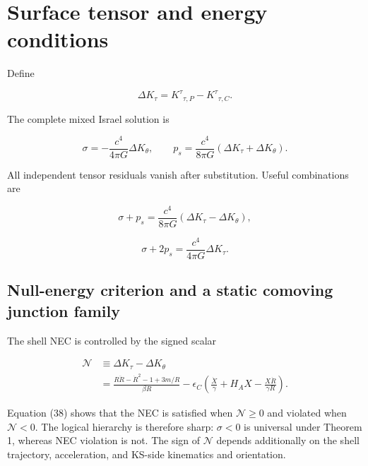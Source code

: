 \documentclass[pdflatex,sn-mathphys-num]{sn-jnl}
\begin{document}
\section{Surface tensor and energy conditions}

Define


\begin{equation}
\Delta K_\tau
=K^\tau{}_{\tau,P}-K^\tau{}_{\tau,C}.
\tag{36}
\end{equation}

The complete mixed Israel solution is


\begin{equation}
\boxed{
\sigma=-\frac{c^4}{4\pi G}\Delta K_\theta,
\qquad
p_s=\frac{c^4}{8\pi G}
\left(\Delta K_\tau+\Delta K_\theta\right).
}
\tag{37}
\end{equation}

All independent tensor residuals vanish after substitution. Useful combinations are


\begin{equation}
\sigma+p_s
=\frac{c^4}{8\pi G}
\left(\Delta K_\tau-\Delta K_\theta\right),
\tag{38}
\end{equation}

\begin{equation}
\sigma+2p_s
=\frac{c^4}{4\pi G}\Delta K_\tau.
\tag{39}
\end{equation}

\subsection{Null-energy criterion and a static comoving junction family}

The shell NEC is controlled by the signed scalar


\begin{equation}
\begin{aligned}
\mathcal N
&\equiv \Delta K_\tau-\Delta K_\theta \\
&=\frac{R\ddot R-\dot R^2-1+3m/R}{\beta R}
-\epsilon_C\left(
\frac{\dot X}{\gamma}+H_AX
-\frac{X\dot R}{\gamma R}
\right).
\end{aligned}
\tag{40}
\end{equation}

Equation (38) shows that the NEC is satisfied when \(\mathcal N\ge0\) and violated when \(\mathcal N<0\). The logical hierarchy is therefore sharp: \(\sigma<0\) is universal under Theorem 1, whereas NEC violation is not. The sign of \(\mathcal N\) depends additionally on the shell trajectory, acceleration, and KS-side kinematics and orientation.
\end{document}
